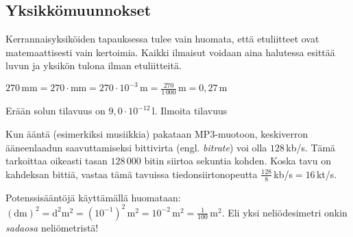 \subsection{Yksikkömuunnokset}

Kerrannaisyksiköiden tapauksessa tulee vain huomata, että etuliitteet ovat matemaattisesti vain kertoimia. Kaikki ilmaisut voidaan aina halutessa esittää luvun ja yksikön tulona ilman etuliitteitä.

\begin{esimerkki}
$270\,\text{mm}=270\cdot\text{mm}=270\cdot10^{-3}\,\text{m}=\frac{270}{1\,000}\,\text{m}=0,27\,\text{m}$
\end{esimerkki}

\begin{esimerkki}
Erään solun tilavuus on $9,0 \cdot 10^{-12}$\,l. Ilmoita tilavuus
	\begin{esimratk}
	\end{esimratk}
\end{esimerkki}

\begin{esimerkki}
Kun ääntä (esimerkiksi musiikkia) pakataan MP3-muotoon, keskiverron ääneenlaadun saavuttamiseksi bittivirta (engl. \textit{bitrate}) voi olla $128$\,kb/s. Tämä tarkoittaa oikeasti tasan $128\,000$ bitin siirtoa sekuntia kohden. Koska tavu on kahdeksan bittiä, vastaa tämä tavuissa tiedonsiirtonopeutta $\frac{128}{8}$\,kb/s$=16$\,kt/s.
\end{esimerkki}


\begin{esimerkki}
Potenssisääntöjä käyttämällä huomataan: $(\text{dm})^2=\text{d}^2\text{m}^2=(10^{-1})^2\, \text{m}^2=10^{-2}\,\text{m}^2=\frac{1}{100}\, \text{m}^2$. Eli yksi neliödesimetri onkin \textit{sadaosa} neliömetristä!
\end{esimerkki}

